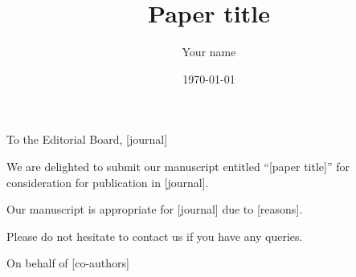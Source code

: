 \documentclass{coverletter}
\title{Paper title}
\author{Your name}
\date{\today}
\begin{document}
\maketitle

\opening{To the Editorial Board, [journal]}

We are delighted to submit our manuscript entitled ``[paper title]'' for consideration for publication in [journal].

\lipsum[1]

\lipsum[2]

Our manuscript is appropriate for [journal] due to [reasons].

Please do not hesitate to contact us if you have any queries. 

\signoff

\vspace{1em}
\noindent On behalf of [co-authors]
\end{document}
